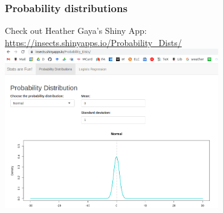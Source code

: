 \documentclass[color=usenames,dvipsnames]{beamer}\usepackage[]{graphicx}\usepackage[]{xcolor}
\begin{document}
\begin{frame}[fragile]
  \frametitle{Probability distributions}
  Check out Heather Gaya's Shiny App: \\
  \vfill
  \centering
  \href{ 
    https://insects.shinyapps.io/Probability_Dists/
  }{
    \large
    \color{blue}
    {https://insects.shinyapps.io/Probability\_Dists/} 
  } \\
  \vfill
  \includegraphics[width=0.7\textwidth]{figs/probDists} \\
\end{frame}
\end{document}
